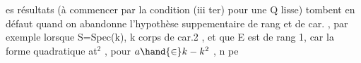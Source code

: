  es résultats  (à commencer par la condition (iii ter) pour une Q
lisse)\hand{,} tombent en défaut quand on abandonne l'hypothèse suppementaire
de rang et de car. , par exemple lorsque S=Spec(k), k corps  de car.2 , et
que E est de rang 1, car la forme quadratique at$^{2}$ , pour $a\hand{\in} k - k^{2}$ , n pe


